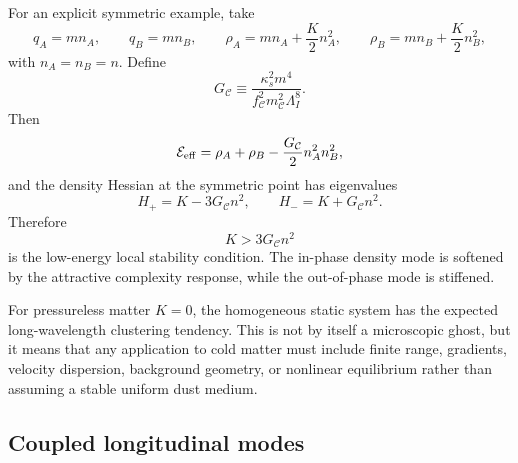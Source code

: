 \documentclass[11pt]{article}
\begin{document}
For an explicit symmetric example, take
\begin{equation}
q_A=m n_A,
\qquad
q_B=m n_B,
\qquad
\rho_A=mn_A+\frac{K}{2}n_A^2,
\qquad
\rho_B=mn_B+\frac{K}{2}n_B^2,
\label{eq:symmetricEOS}
\end{equation}
with $n_A=n_B=n$.  Define
\begin{equation}
G_{\mathcal C}
\equiv
\frac{\kappa_s^2m^4}
{f_{\mathcal C}^2m_{\mathcal C}^2\Lambda_I^8}.
\label{eq:GCdef}
\end{equation}
Then
\begin{equation}
\mathcal E_{\rm eff}
=\rho_A+\rho_B
-\frac{G_{\mathcal C}}{2}n_A^2n_B^2,
\label{eq:EeffSym}
\end{equation}
and the density Hessian at the symmetric point has eigenvalues
\begin{equation}
H_+=K-3G_{\mathcal C}n^2,
\qquad
H_-=K+G_{\mathcal C}n^2.
\label{eq:HessianEigen}
\end{equation}
Therefore
\begin{equation}
\boxed{K>3G_{\mathcal C}n^2}
\label{eq:compressibilityBound}
\end{equation}
is the low-energy local stability condition.  The in-phase density mode is softened by the attractive complexity response, while the out-of-phase mode is stiffened.

For pressureless matter $K=0$, the homogeneous static system has the expected long-wavelength clustering tendency.  This is not by itself a microscopic ghost, but it means that any application to cold matter must include finite range, gradients, velocity dispersion, background geometry, or nonlinear equilibrium rather than assuming a stable uniform dust medium.

\subsection{Coupled longitudinal modes}
\end{document}
